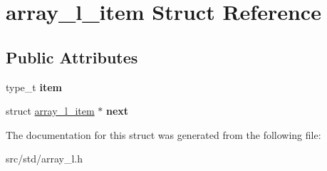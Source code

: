 \hypertarget{structarray__l__item}{}\section{array\+\_\+l\+\_\+item Struct Reference}
\label{structarray__l__item}
\subsection*{Public Attributes}
\begin{DoxyCompactItemize}
\item 
\mbox{\label{structarray__l__item_aed7f7a5042205f8d85ddf00e9db75893}} 
type\+\_\+t {\bfseries item}
\item 
\mbox{\label{structarray__l__item_a9141bfd734d8a54f624ba25bf42e558c}} 
struct \hyperlink{structarray__l__item}{array\+\_\+l\+\_\+item} $\ast$ {\bfseries next}
\end{DoxyCompactItemize}


The documentation for this struct was generated from the following file\+:\begin{DoxyCompactItemize}
\item 
src/std/array\+\_\+l.\+h\end{DoxyCompactItemize}

